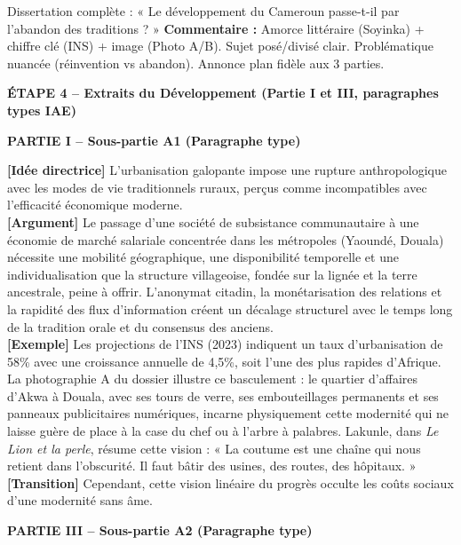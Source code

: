 \documentclass[11pt]{article}
\begin{document}
\begin{exoresolu}{Dissertation complète : « Le développement du Cameroun passe-t-il par l'abandon des traditions ? »}
\textbf{Commentaire :} Amorce littéraire (Soyinka) + chiffre clé (INS) + image (Photo A/B). Sujet posé/divisé clair. Problématique nuancée (réinvention vs abandon). Annonce plan fidèle aux 3 parties.

\textbf{ÉTAPE 4 -- Extraits du Développement (Partie I et III, paragraphes types IAE)}

\medskip
\textbf{PARTIE I -- Sous-partie A1 (Paragraphe type)}

\textbf{[Idée directrice]} L'urbanisation galopante impose une rupture anthropologique avec les modes de vie traditionnels ruraux, perçus comme incompatibles avec l'efficacité économique moderne. \\
\textbf{[Argument]} Le passage d'une société de subsistance communautaire à une économie de marché salariale concentrée dans les métropoles (Yaoundé, Douala) nécessite une mobilité géographique, une disponibilité temporelle et une individualisation que la structure villageoise, fondée sur la lignée et la terre ancestrale, peine à offrir. L'anonymat citadin, la monétarisation des relations et la rapidité des flux d'information créent un décalage structurel avec le temps long de la tradition orale et du consensus des anciens. \\
\textbf{[Exemple]} Les projections de l'INS (2023) indiquent un taux d'urbanisation de 58\% avec une croissance annuelle de 4,5\%, soit l'une des plus rapides d'Afrique. La photographie A du dossier illustre ce basculement : le quartier d'affaires d'Akwa à Douala, avec ses tours de verre, ses embouteillages permanents et ses panneaux publicitaires numériques, incarne physiquement cette modernité qui ne laisse guère de place à la case du chef ou à l'arbre à palabres. Lakunle, dans \emph{Le Lion et la perle}, résume cette vision : « La coutume est une chaîne qui nous retient dans l'obscurité. Il faut bâtir des usines, des routes, des hôpitaux. » \\
\textbf{[Transition]} Cependant, cette vision linéaire du progrès occulte les coûts sociaux d'une modernité sans âme.

\medskip
\textbf{PARTIE III -- Sous-partie A2 (Paragraphe type)}


\end{exoresolu}
\end{document}

